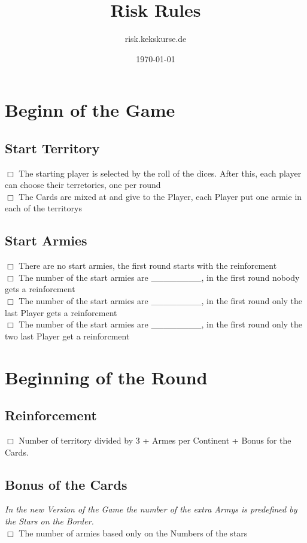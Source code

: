 \documentclass{article}
\title{Risk Rules}
\date{\today}
\author{risk.kekskurse.de}
\begin{document}
\maketitle

\section{Beginn of the Game}

\subsection{Start Territory}
$\Box$ The starting player is selected by the roll of the dices. After this, each player can choose their terretories, one per round\\
$\Box$ The Cards are mixed at and give to the Player, each Player put one armie in each of the territorys
\subsection{Start Armies}
$\Box$ There are no start armies, the first round starts with the reinforcment\\
$\Box$ The number of the start armies are \_\_\_\_\_\_\_\_, in the first round nobody gets a reinforcment\\
$\Box$ The number of the start armies are \_\_\_\_\_\_\_\_, in the first round only the last Player gets a reinforcment\\
$\Box$ The number of the start armies are \_\_\_\_\_\_\_\_, in the first round only the two last Player get a reinforcment\\

\section{Beginning of the Round}

\subsection{Reinforcement}
$\Box$ Number of territory divided by 3 + Armes per Continent + Bonus for the Cards.\\

\subsection{Bonus of the Cards}
\textit{In the new Version of the Game the number of the extra Armys is predefined by the Stars on the Border. }\\
$\Box$ The number of armies based only on the Numbers of the stars\\
\end{document}
